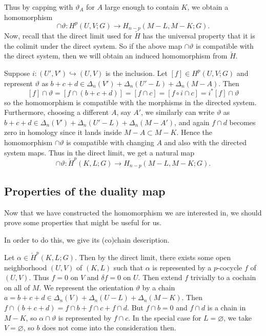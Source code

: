 \documentclass[reqno]{amsart}
\theoremstyle{definition}
\theoremstyle{remark}
\begin{document}
    Thus by capping with $\vartheta_A$ for
    $A$ large enough to contain
    $K$, we obtain a homomorphism
    \[
    \cap \vartheta \colon
    H^{p} \left( U, V ; G \right) \to 
    H_{n-p} (M-L, M - K;G).
    \] 
    Now, recall that the direct limit
    used for $\check{H}$ has the universal property that it
    is the colimit under the direct system.
    So if the above map
    $\cap \vartheta$ is compatible with the direct system, then
    we will obtain an induced homomorphism
    from $\check{H}$.

    Suppose $i \colon \left( U',V' \right) \hookrightarrow 
    \left( U,V \right) $ is the inclusion. Let
    $\left[ f \right] \in 
    H^{p}\left( U,V;G \right) $ and
     represent $\vartheta$ as
     $b+c+d \in \Delta_n (V') + \Delta_n (U' - L) +
     \Delta_n (M-A)$. Then
     \[
     \left[ f \right] \cap \vartheta
     = \left[ f \cap \left( b + c+ d \right)  \right] 
     = \left[ f \cap c \right] 
     = \left[ f \circ i \cap c \right] 
     = i^{*} \left[ f \right] \cap
     \vartheta
     \] 
     so the homomorphism is compatible with the morphisms
     in the directed system. Furthermore, choosing a different
     $A$, say $A'$, we similarly can write
     $\vartheta$ as
     $b+c+d \in \Delta_n (V') + \Delta_n (U'-L) + \Delta_n (M-A')$, and
     again $f \cap d$ becomes zero in homology
     since it lands inside $M - A \subset M - K$.
     Hence the homomorphism
      $\cap \vartheta$ is compatible with changing $A$ and
      also with the directed system maps. Thus
      in the direct limit, we get a natural map
      \[
      \cap \vartheta \colon
      \check{H}^{p} (K,L;G) \to H_{n-p} (M-L, M-K;G).
      \] 


      \subsection{Properties of the duality map}

      Now that we have constructed the homomorphism
      we are interested in, we should prove some properties
      that might be useful for us.

      In order to do this, we give its (co)chain description.

      Let $\alpha \in \check{H}^{p}(K,L;G)$. Then
      by the direct limit, there exists
      some open neighborhood $(U,V)$ of $(K,L)$ such that
      $\alpha$ is represented by a 
      $p$-cocycle $f$ of $(U,V)$.
      Thus $f = 0$ on $V$ and
      $\delta f = 0$ on $U$.
      Then extend $f$ trivially to a cochain on all of $M$.
      We represent the orientation
      $\vartheta$ by a chain $a = b+c+d \in 
      \Delta_n (V) + \Delta_n (U-L) + \Delta_n (M-K)$.
      Then $f \cap \left( b+c+d \right) = 
      f \cap b + f \cap c + f \cap d$. But
      $f \cap b = 0$ and
      $f \cap d$ is a chain in $M - K$, so
      $\alpha \cap \vartheta$ is represented by
      $f \cap c$. In the special case for
      $L = \varnothing$, we take $V = \varnothing$, so
      $b$ does not come into the consideration then.\\
\end{document}
